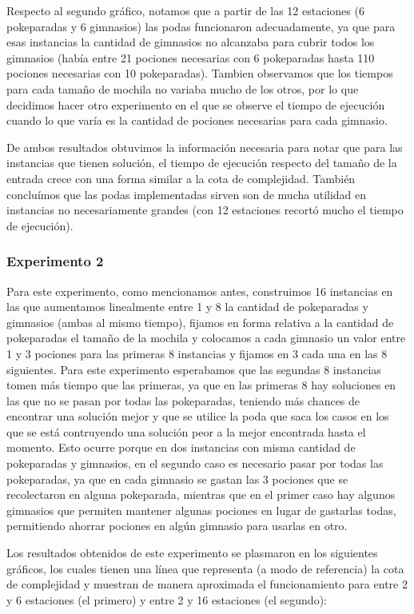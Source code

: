       Respecto al segundo gráfico, notamos que a partir de las 12 estaciones (6 pokeparadas y 6 gimnasios) las podas funcionaron adecuadamente, ya que para esas instancias la cantidad de gimnasios no alcanzaba para cubrir todos los gimnasios (había entre 21 pociones necesarias con 6 pokeparadas hasta 110 pociones necesarias con 10 pokeparadas). Tambien observamos que los tiempos para cada tamaño de mochila no variaba mucho de los otros, por lo que decidimos hacer otro experimento en el que se observe el tiempo de ejecución cuando lo que varía es la cantidad de pociones necesarias para cada gimnasio.

      De ambos resultados obtuvimos la información necesaria para notar que para las instancias que tienen solución, el tiempo de ejecución respecto del tamaño de la entrada crece con una forma similar a la cota de complejidad. También concluímos que las podas implementadas sirven son de mucha utilidad en instancias no necesariamente grandes (con 12 estaciones recortó mucho el tiempo de ejecución).

    \subsubsection{Experimento 2}


      Para este experimento, como mencionamos antes, construimos 16 instancias en las que aumentamos linealmente entre 1 y 8 la cantidad de pokeparadas y gimnasios (ambas al mismo tiempo), fijamos en forma relativa a la cantidad de pokeparadas el tamaño de la mochila y colocamos a cada gimnasio un valor entre 1 y 3 pociones para las primeras 8 instancias y fijamos en 3 cada una en las 8 siguientes.
      Para este experimento esperabamos que las segundas 8 instancias tomen más tiempo que las primeras, ya que en las primeras 8 hay soluciones en las que no se pasan por todas las pokeparadas, teniendo más chances de encontrar una solución mejor y que se utilice la poda que saca los casos en los que se está contruyendo una solución peor a la mejor encontrada hasta el momento. Esto ocurre porque en dos instancias con misma cantidad de pokeparadas y gimnasios, en el segundo caso es necesario pasar por todas las pokeparadas, ya que en cada gimnasio se gastan las 3 pociones que se recolectaron en alguna pokeparada, mientras que en el primer caso hay algunos gimnasios que permiten mantener algunas pociones en lugar de gastarlas todas, permitiendo ahorrar pociones en algún gimnasio para usarlas en otro.

      Los resultados obtenidos de este experimento se plasmaron en los siguientes gráficos, los cuales tienen una línea que representa (a modo de referencia) la cota de complejidad y muestran de manera aproximada el funcionamiento para entre 2 y 6 estaciones (el primero) y entre 2 y 16 estaciones (el segundo):

